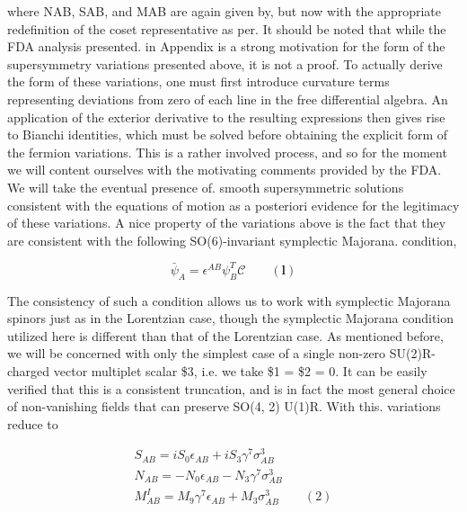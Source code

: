 \documentclass{article}
\begin{document}
\sloppy

where NAB, SAB, and MAB are again given by, but now with the appropriate redefinition
of the coset representative as per. It should be noted that while the FDA analysis presented.
in Appendix is a strong motivation for the form of the supersymmetry variations presented
above, it is not a proof. To actually derive the form of these variations, one must first
introduce curvature terms representing deviations from zero of each line in the free differential
algebra. An application of the exterior derivative to the resulting expressions then gives rise
to Bianchi identities, which must be solved before obtaining the explicit form of the fermion
variations. This is a rather involved process, and so for the moment we will content ourselves
with the motivating comments provided by the FDA. We will take the eventual presence of.
smooth supersymmetric solutions consistent with the equations of motion as a posteriori
evidence for the legitimacy of these variations. A nice property of the variations above is
the fact that they are consistent with the following SO(6)-invariant symplectic Majorana.
condition,


\begin{equation}
\bar { \psi } _ { A } = \epsilon ^ { A B } \psi _ { B } ^ { T } \mathcal { C } \qquad ( \mathbf { l } )
\end{equation}


The consistency of such a condition allows us to work with symplectic Majorana spinors just
as in the Lorentzian case, though the symplectic Majorana condition utilized here is different
than that of the Lorentzian case. As mentioned before, we will be concerned with only the
simplest case of a single non-zero SU(2)R-charged vector multiplet scalar \$3, i.e. we take
\$1 = \$2 = 0. It can be easily verified that this is a consistent truncation, and is in fact the
most general choice of non-vanishing fields that can preserve SO(4, 2)  U(1)R. With this.
variations reduce to


\begin{equation}
\begin{array} { c } { S _ { A B } = i S _ { 0 } \epsilon _ { A B } + i S _ { 3 } \gamma ^ { 7 } \sigma _ { A B } ^ { 3 } } \\ { N _ { A B } = - N _ { 0 } \epsilon _ { A B } - N _ { 3 } \gamma ^ { 7 } \sigma _ { A B } ^ { 3 } } \\ { M _ { A B } ^ { I } = M _ { 9 } \gamma ^ { 7 } \epsilon _ { A B } + M _ { 3 } \sigma _ { A B } ^ { 3 } \qquad ( 2 ) } \end{array}
\end{equation}
\end{document}
